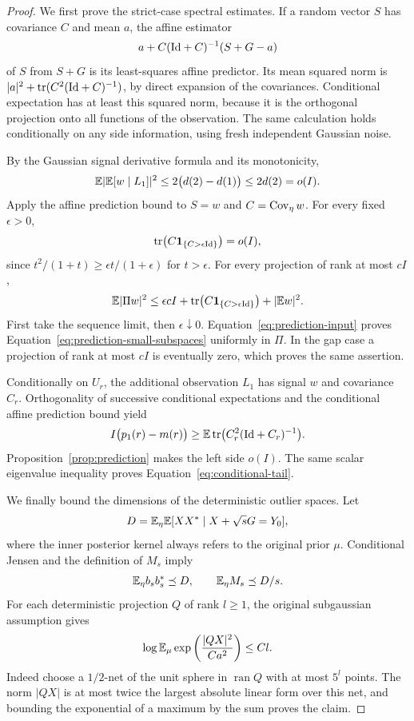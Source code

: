 \begin{proof}
We first prove the strict-case spectral estimates.  If a random vector
$S$ has covariance $C$ and mean $a$, the affine estimator
\[
 a+C(\mathrm{Id}+C)^{-1}(S+G-a)
\]
of $S$ from $S+G$ is its least-squares affine predictor.  Its mean
squared norm is $|a|^2+\operatorname{tr}(C^2(\mathrm{Id}+C)^{-1})$, by direct expansion of the
covariances.  Conditional expectation has at least this squared
norm, because it is the orthogonal projection onto all functions of
the observation.  The same calculation holds conditionally on any
side information, using fresh independent Gaussian noise.

By the Gaussian signal derivative formula and its monotonicity,
\[
 \mathbb E|\mathbb E[w\mid L_1]|^2
 \le2\bigl(d(2)-d(1)\bigr)\le2d(2)=o(I).
\]
Apply the affine prediction bound to $S=w$ and $C=\operatorname{Cov}_\eta w$.
For every fixed $\epsilon>0$,
\begin{equation}
 \operatorname{tr}\bigl(C\mathbf 1_{\{C>\epsilon\mathrm{Id}\}}\bigr)=o(I),
 \label{eq:prediction-unconditional-tail}
\end{equation}
since $t^2/(1+t)\ge\epsilon t/(1+\epsilon)$ for $t>\epsilon$.
For every projection of rank at most $cI$,
\[
 \mathbb E|\Pi w|^2
 \le\epsilon cI+\operatorname{tr}\bigl(C\mathbf 1_{\{C>\epsilon\mathrm{Id}\}}\bigr)
            +|\mathbb E w|^2.
\]
First take the sequence limit, then $\epsilon\downarrow0$.
Equation~\eqref{eq:prediction-input} proves
Equation~\eqref{eq:prediction-small-subspaces} uniformly in $\Pi$.
In the gap case a projection of rank at most $cI$ is eventually zero,
which proves the same assertion.

Conditionally on $U_r$, the additional observation $L_1$ has signal
$w$ and covariance $C_r$.  Orthogonality of successive conditional
expectations and the conditional affine prediction bound yield
\[
 I\bigl(p_1(r)-m(r)\bigr)
 \ge\mathbb E\operatorname{tr}\bigl(C_r^2(\mathrm{Id}+C_r)^{-1}\bigr).
\]
Proposition~\ref{prop:prediction} makes the left side $o(I)$.
The same scalar eigenvalue inequality proves
Equation~\eqref{eq:conditional-tail}.

We finally bound the dimensions of the deterministic outlier spaces.
Let
\[
 D=\mathbb E_\eta\mathbb E[XX^*\mid X+\sqrt sG=Y_0],
\]
where the inner posterior kernel always refers to the original prior
$\mu$.  Conditional Jensen and the definition of $M_s$ imply
\begin{equation}
 \mathbb E_\eta b_sb_s^*\preceq D,\qquad
 \mathbb E_\eta M_s\preceq D/s.
 \label{eq:prediction-posterior-domination}
\end{equation}
For each deterministic projection $Q$ of rank $l\ge1$, the original
subgaussian assumption gives
\begin{equation}
 \log\mathbb E_\mu\exp\left(\frac{|QX|^2}{Ca^2}\right)\le Cl.
 \label{eq:prediction-subspace-moment}
\end{equation}
Indeed choose a $1/2$-net of the unit sphere in
$\operatorname{ran}Q$ with at most $5^l$ points.  The norm $|QX|$ is
at most twice the largest absolute linear form over this net, and
bounding the exponential of a maximum by the sum proves the claim.


\end{proof}
